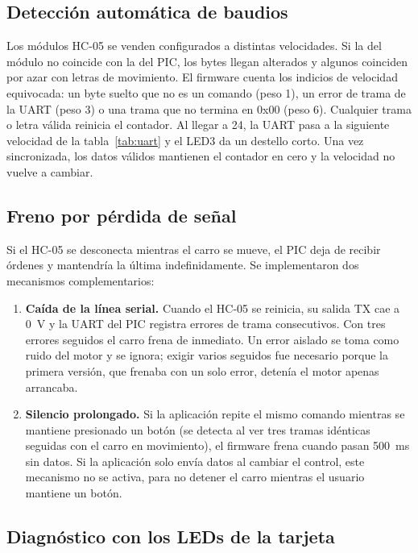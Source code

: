 \subsection{Detección automática de baudios}
\label{sec:autobaud}

Los módulos HC-05 se venden configurados a distintas velocidades. Si la del
módulo no coincide con la del PIC, los bytes llegan alterados y algunos
coinciden por azar con letras de movimiento. El firmware cuenta los indicios de
velocidad equivocada: un byte suelto que no es un comando (peso 1), un error de
trama de la UART (peso 3) o una trama que no termina en 0x00 (peso 6). Cualquier
trama o letra válida reinicia el contador. Al llegar a 24, la UART pasa a la
siguiente velocidad de la tabla~\ref{tab:uart} y el LED3 da un destello corto.
Una vez sincronizada, los datos válidos mantienen el contador en cero y la
velocidad no vuelve a cambiar.

\subsection{Freno por pérdida de señal}
\label{sec:failsafe}

Si el HC-05 se desconecta mientras el carro se mueve, el PIC deja de recibir
órdenes y mantendría la última indefinidamente. Se implementaron dos
mecanismos complementarios:

\begin{enumerate}
  \item \textbf{Caída de la línea serial.} Cuando el HC-05 se reinicia, su
        salida TX cae a \SI{0}{\volt} y la UART del PIC registra errores de
        trama consecutivos. Con tres errores seguidos el carro frena de
        inmediato. Un error aislado se toma como ruido del motor y se ignora;
        exigir varios seguidos fue necesario porque la primera versión, que
        frenaba con un solo error, detenía el motor apenas arrancaba.
  \item \textbf{Silencio prolongado.} Si la aplicación repite el mismo comando
        mientras se mantiene presionado un botón (se detecta al ver tres
        tramas idénticas seguidas con el carro en movimiento), el firmware
        frena cuando pasan \SI{500}{\milli\second} sin datos. Si la aplicación
        solo envía datos al cambiar el control, este mecanismo no se activa,
        para no detener el carro mientras el usuario mantiene un botón.
\end{enumerate}

\subsection{Diagnóstico con los LEDs de la tarjeta}

